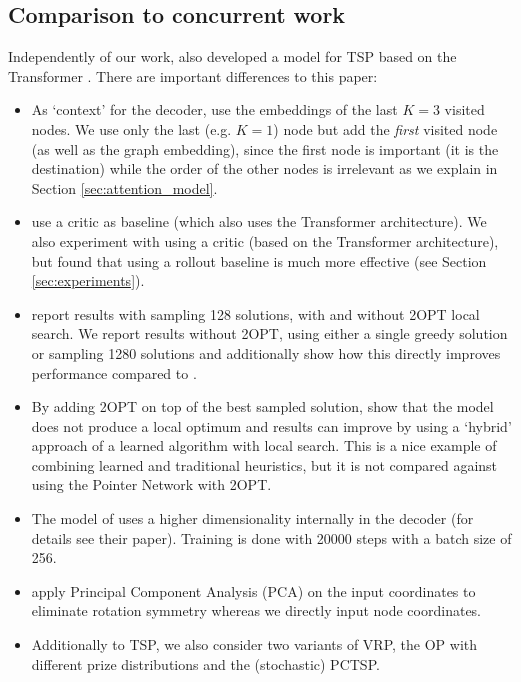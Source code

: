 \subsection{Comparison to concurrent work}
\label{app:deudon}
Independently of our work, \citet{deudon2018learning} also developed a model for TSP based on the Transformer \citep{vaswani2017attention}. There are important differences to this paper:
\begin{itemize}
    \item As `context' for the decoder, \citet{deudon2018learning} use the embeddings of the last $K = 3$ visited nodes. We use only the last (e.g. $K = 1$) node but add the \emph{first} visited node (as well as the graph embedding), since the first node is important (it is the destination) while the order of the other nodes is irrelevant as we explain in Section \ref{sec:attention_model}.
    \item \citet{deudon2018learning} use a critic as baseline (which also uses the Transformer architecture). We also experiment with using a critic (based on the Transformer architecture), but found that using a rollout baseline is much more effective (see Section \ref{sec:experiments}).
    \item \citet{deudon2018learning} report results with sampling 128 solutions, with and without 2OPT local search. We report results without 2OPT, using either a single greedy solution or sampling 1280 solutions and additionally show how this directly improves performance compared to \citet{bello2016neural}.
    \item By adding 2OPT on top of the best sampled solution, \citet{deudon2018learning} show that the model does not produce a local optimum and results can improve by using a `hybrid' approach of a learned algorithm with local search. This is a nice example of combining learned and traditional heuristics, but it is not compared against using the Pointer Network \citep{bello2016neural} with 2OPT.
    \item The model of \citet{deudon2018learning} uses a higher dimensionality internally in the decoder (for details see their paper). Training is done with 20000 steps with a batch size of 256.
    \item \citet{deudon2018learning} apply Principal Component Analysis (PCA) on the input coordinates to eliminate rotation symmetry whereas we directly input node coordinates.
    \item Additionally to TSP, we also consider two variants of VRP, the OP with different prize distributions and the (stochastic) PCTSP.
\end{itemize}

